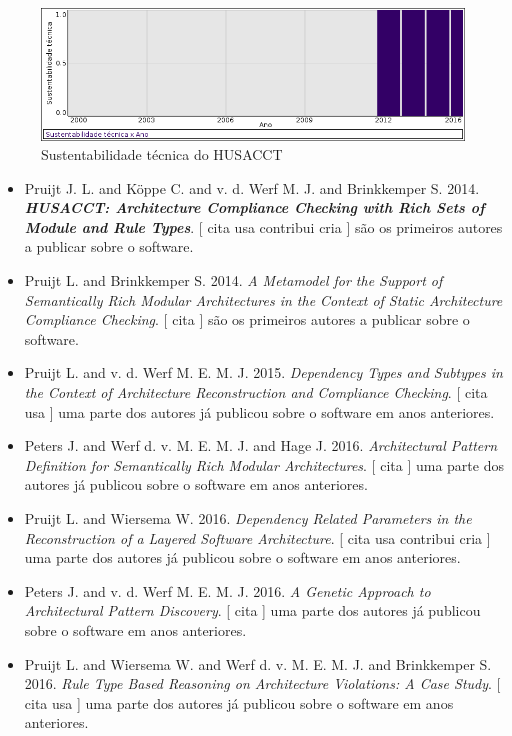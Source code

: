 \begin{figure}[h]
  \center
  \includegraphics[scale=0.50]{result-documents/charts/husacct.png}
  \caption{Sustentabilidade técnica do HUSACCT}
\end{figure}


\begin{itemize}
\item Pruijt J. L. and K\"{o}ppe C. and v. d. Werf M. J. and Brinkkemper S.
      2014.
        \textbf{\textit{ HUSACCT: Architecture Compliance Checking with Rich Sets of Module and Rule Types}}.
      [
          cita
          usa
          contribui
          cria
      ]
são os primeiros autores a publicar sobre o software.
\item Pruijt L. and Brinkkemper S.
      2014.
        \textit{ A Metamodel for the Support of Semantically Rich Modular Architectures in the Context of Static Architecture Compliance Checking}.
      [
          cita
      ]
são os primeiros autores a publicar sobre o software.
\item Pruijt L. and v. d. Werf M. E. M. J.
      2015.
        \textit{ Dependency Types and Subtypes in the Context of Architecture Reconstruction and Compliance Checking}.
      [
          cita
          usa
      ]
uma parte dos autores já publicou sobre o software em anos anteriores.
\item Peters J. and Werf d. v. M. E. M. J. and Hage J.
      2016.
        \textit{ Architectural Pattern Definition for Semantically Rich Modular Architectures}.
      [
          cita
      ]
uma parte dos autores já publicou sobre o software em anos anteriores.
\item Pruijt L. and Wiersema W.
      2016.
        \textit{ Dependency Related Parameters in the Reconstruction of a Layered Software Architecture}.
      [
          cita
          usa
          contribui
          cria
      ]
uma parte dos autores já publicou sobre o software em anos anteriores.
\item Peters J. and v. d. Werf M. E. M. J.
      2016.
        \textit{ A Genetic Approach to Architectural Pattern Discovery}.
      [
          cita
      ]
uma parte dos autores já publicou sobre o software em anos anteriores.
\item Pruijt L. and Wiersema W. and Werf d. v. M. E. M. J. and Brinkkemper S.
      2016.
        \textit{ Rule Type Based Reasoning on Architecture Violations: A Case Study}.
      [
          cita
          usa
      ]
uma parte dos autores já publicou sobre o software em anos anteriores.
\end{itemize}
